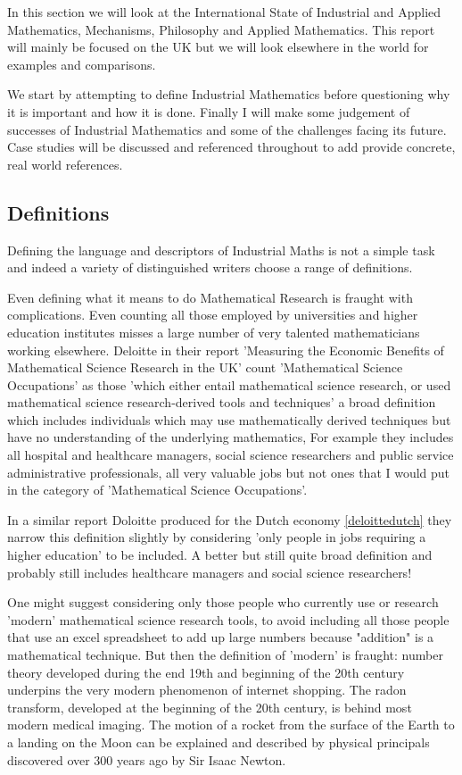 \documentclass[11pt]{article} %
\begin{document}
	In this section we will look at the International State of Industrial and Applied Mathematics, Mechanisms, Philosophy and Applied Mathematics. This report will mainly be  focused on the UK but we will look elsewhere in the world for examples and comparisons. 
	
	We start by attempting to define Industrial Mathematics before questioning why it is important  and how it is done. Finally I will make some judgement of successes of Industrial Mathematics  and some of the challenges facing its future. Case studies will be discussed and referenced throughout to add provide concrete, real world references. 
	
	\subsection{Definitions} 
	
	Defining the language and descriptors of  Industrial Maths is not a simple task and indeed a variety of distinguished writers choose a range of definitions. 
	
	Even defining what it means to do Mathematical Research is fraught with complications. Even counting all those employed by universities and higher education institutes misses a large number of very talented mathematicians working elsewhere. 	Deloitte in their report 'Measuring the Economic Benefits of Mathematical Science Research in the UK' \cite{deloitteuk} count 'Mathematical Science Occupations' as those 'which either entail mathematical science research, or used mathematical science research-derived tools and techniques' a broad definition which includes individuals which may use mathematically derived techniques but have no understanding of the underlying mathematics, For example they includes all hospital and healthcare managers, social science researchers and public service administrative professionals, all very valuable jobs but not ones that I would put in the category of 'Mathematical Science Occupations'. 
	
	
	In a similar report Doloitte produced for the Dutch economy \ref{deloittedutch} they narrow this definition slightly by considering 'only people in jobs requiring a higher education' to be included.  A better but still quite broad definition and probably still includes healthcare managers and social science researchers!
	
	
	One might suggest considering only those people who currently use or research 'modern' mathematical science research tools, to avoid including all those people that use an excel spreadsheet to add up large numbers because "addition" is a mathematical technique. But then the definition of 'modern' is fraught: number theory developed during the end 19th and beginning of the 20th century underpins the very modern phenomenon of internet shopping. The radon transform, developed at the beginning of the 20th century, is behind most modern medical imaging. The motion of a rocket from the surface of the Earth to a landing on the Moon can be explained and described by physical principals discovered over 300 years ago by Sir Isaac Newton.
	
\end{document}
